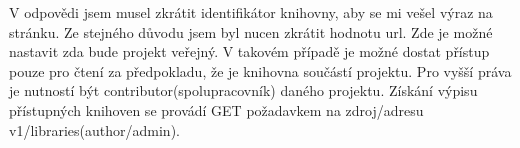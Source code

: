 \par V odpovědi jsem musel zkrátit identifikátor knihovny, aby se mi vešel výraz na stránku. Ze stejného důvodu jsem byl nucen zkrátit hodnotu url. Zde je možné nastavit zda bude projekt veřejný. V takovém případě je možné dostat přístup pouze pro čtení za předpokladu, že je knihovna součástí projektu. Pro vyšší práva je nutností být contributor(spolupracovník) daného projektu. Získání výpisu přístupných knihoven se provádí GET požadavkem na zdroj/adresu v1/libraries(author/admin).